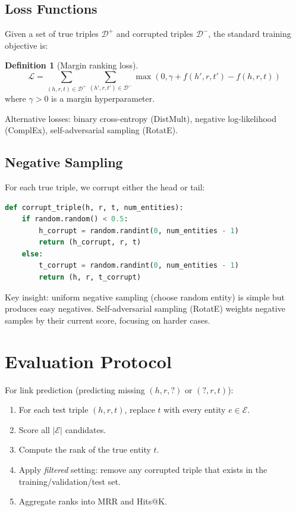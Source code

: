 \documentclass[11pt,a4paper,oneside,openany]{book}
\theoremstyle{definition}
\newtheorem{definition}{Definition}[chapter]
\theoremstyle{plain}
\theoremstyle{remark}
\newcommand{\cE}{\mathcal{E}}
\begin{document}
\subsection{Loss Functions}

Given a set of true triples $\mathcal{D}^+$ and corrupted triples $\mathcal{D}^-$, the standard training objective is:

\begin{definition}[Margin ranking loss]
	$$\mathcal{L} = \sum_{(h,r,t) \in \mathcal{D}^+} \sum_{(h',r,t') \in \mathcal{D}^-} \max(0, \gamma + f(h', r, t') - f(h, r, t))$$
	where $\gamma > 0$ is a margin hyperparameter.
\end{definition}

Alternative losses: binary cross-entropy (DistMult), negative log-likelihood (ComplEx), self-adversarial sampling (RotatE).

\subsection{Negative Sampling}

For each true triple, we corrupt either the head or tail:

\begin{lstlisting}[language=Python,numbers=none]
def corrupt_triple(h, r, t, num_entities):
    if random.random() < 0.5:
        h_corrupt = random.randint(0, num_entities - 1)
        return (h_corrupt, r, t)
    else:
        t_corrupt = random.randint(0, num_entities - 1)
        return (h, r, t_corrupt)
\end{lstlisting}

Key insight: uniform negative sampling (choose random entity) is simple but produces easy negatives. Self-adversarial sampling (RotatE) weights negative samples by their current score, focusing on harder cases.

\section{Evaluation Protocol}\label{sec:emb-eval}

For link prediction (predicting missing $(h, r, ?)$ or $(?, r, t)$):

\begin{enumerate}
	\item For each test triple $(h, r, t)$, replace $t$ with every entity $e \in \cE$.
	\item Score all $|\cE|$ candidates.
	\item Compute the rank of the true entity $t$.
	\item Apply \emph{filtered} setting: remove any corrupted triple that exists in the training/validation/test set.
	\item Aggregate ranks into MRR and Hits@K.
\end{enumerate}
\end{document}
